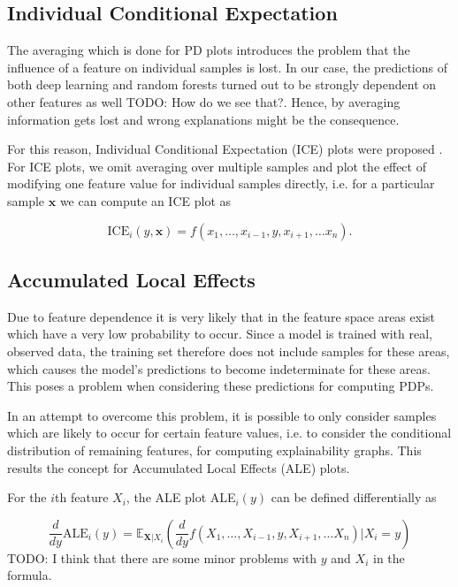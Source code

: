 \documentclass[10pt,sigconf,letterpaper]{acmart}
\newcommand\note[2]{{\color{#1}#2}}
\newcommand\todo[1]{{\note{red}{TODO: #1}}}
\begin{document}
\subsection{Individual Conditional Expectation}
The averaging which is done for PD plots introduces the problem that the influence of a feature on individual samples is lost. In our case, the predictions of both deep learning and random forests turned out to be strongly dependent on other features as well \todo{How do we see that?}. Hence, by averaging information gets lost and wrong explanations might be the consequence.

For this reason, Individual Conditional Expectation (ICE) plots were proposed \cite{goldstein2015peeking}. For ICE plots, we omit averaging over multiple samples and plot the effect of modifying one feature value for  individual samples directly, i.e. for a particular sample $\boldsymbol x$ we can compute an ICE plot as

\begin{equation}
\text{ICE}_i(y, \boldsymbol x) = f(x_1,\ldots,x_{i-1},y,x_{i+1},\ldots x_n).
\end{equation}

\subsection{Accumulated Local Effects}
Due to feature dependence it is very likely that in the feature space areas exist which have a very low probability to occur. Since a model is trained with real, observed data, the training set therefore does not include samples for these areas, which causes the model's predictions to become indeterminate for these areas. This poses a problem when considering these predictions for computing PDPs. 

In an attempt to overcome this problem, it is possible to only consider samples which are likely to occur for certain feature values, i.e. to consider the conditional distribution of remaining features, for computing explainability graphs. This results the concept for Accumulated Local Effects (ALE) plots. 

For the $i$th feature $X_i$, the ALE plot ALE$_i(y)$ can be defined differentially as



\begin{equation}
\frac{d}{dy} \text{ALE}_i (y) = \mathbb E_{\boldsymbol X | X_i}\left(\frac{d}{dy} f(X_1,\ldots,X_{i-1},y,X_{i+1},\ldots X_n) | X_i=y\right)
\end{equation}
\todo{I think that there are some minor problems with $y$ and $X_i$ in the formula.}
\end{document}
